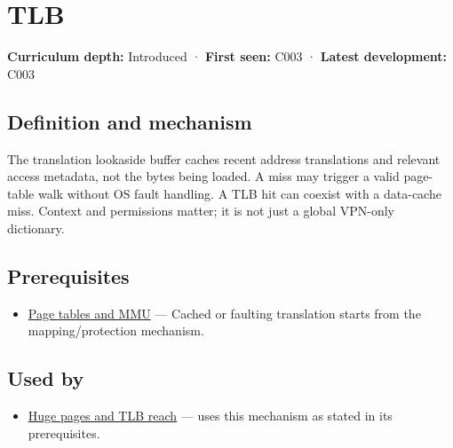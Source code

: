 \hypertarget{appendix-7a2d9c5ce511}{}\label{referencestart:appendix-7a2d9c5ce511}
\section{TLB}\label{appendix-7a2d9c5ce511-tlb}

\hypertarget{appendix-7a2d9c5ce511-tlb}{}

\textbf{Curriculum depth:} Introduced · \textbf{First seen:} C003 · \textbf{Latest development:} C003

\begin{allmightroledefinition}

\subsection{Definition and mechanism}\label{appendix-7a2d9c5ce511-definition-and-mechanism}

\hypertarget{appendix-7a2d9c5ce511-definition-and-mechanism}{}

The translation lookaside buffer caches recent address translations and relevant access metadata, not the bytes being loaded. A miss may trigger a valid page-table walk without OS fault handling. A TLB hit can coexist with a data-cache miss. Context and permissions matter; it is not just a global VPN-only dictionary.

\end{allmightroledefinition}

\subsection{Prerequisites}\label{appendix-7a2d9c5ce511-prerequisites}

\hypertarget{appendix-7a2d9c5ce511-prerequisites}{}

\begin{itemize}
\tightlist
\item
  \hyperref[appendix-01e5905165c4]{Page tables and MMU} --- Cached or faulting translation starts from the mapping/protection mechanism.
\end{itemize}

\subsection{Used by}\label{appendix-7a2d9c5ce511-used-by}

\hypertarget{appendix-7a2d9c5ce511-used-by}{}

\begin{itemize}
\tightlist
\item
  \hyperref[appendix-ce688d1acdab]{Huge pages and TLB reach} --- uses this mechanism as stated in its prerequisites.
\end{itemize}

